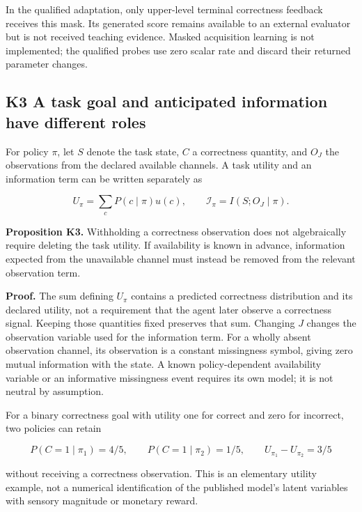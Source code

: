 \documentclass[
  american,
  11pt,
  letterpaper,
]{article}
\begin{document}
In the qualified adaptation, only upper-level terminal correctness feedback receives this mask. Its generated score remains available to an external evaluator but is not received teaching evidence. Masked acquisition learning is not implemented; the qualified probes use zero scalar rate and discard their returned parameter changes.

\subsection{K3 A task goal and anticipated information have different roles}\label{k3-a-task-goal-and-anticipated-information-have-different-roles}

For policy \(\pi\), let \(S\) denote the task state, \(C\) a correctness quantity, and \(O_J\) the observations from the declared available channels. A task utility and an information term can be written separately as

\begin{equation}
U_\pi=\sum_cP(c\mid\pi)u(c),\qquad
\mathcal I_\pi=I(S;O_J\mid\pi).
\tag{K5}
\end{equation}

\textbf{Proposition K3.} Withholding a correctness observation does not algebraically require deleting the task utility. If availability is known in advance, information expected from the unavailable channel must instead be removed from the relevant observation term.

\textbf{Proof.} The sum defining \(U_\pi\) contains a predicted correctness distribution and its declared utility, not a requirement that the agent later observe a correctness signal. Keeping those quantities fixed preserves that sum. Changing \(J\) changes the observation variable used for the information term. For a wholly absent observation channel, its observation is a constant missingness symbol, giving zero mutual information with the state. A known policy-dependent availability variable or an informative missingness event requires its own model; it is not neutral by assumption.

For a binary correctness goal with utility one for correct and zero for incorrect, two policies can retain

\begin{equation}
P(C=1\mid\pi_1)=4/5,\qquad P(C=1\mid\pi_2)=1/5,
\qquad U_{\pi_1}-U_{\pi_2}=3/5
\tag{K6}
\end{equation}

without receiving a correctness observation. This is an elementary utility example, not a numerical identification of the published model's latent variables with sensory magnitude or monetary reward.
\end{document}
